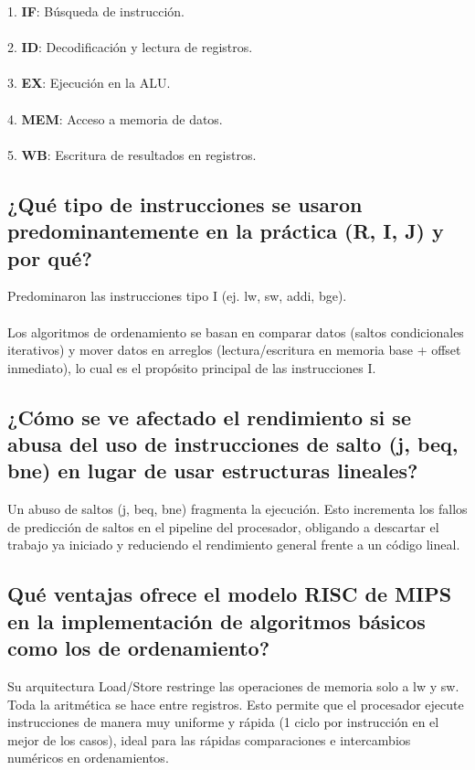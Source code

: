 \documentclass[12pt]{article}
\begin{document}
1. \textbf{IF}: Búsqueda de instrucción.
\\
\\
2. \textbf{ID}: Decodificación y lectura de registros.
\\
\\
3. \textbf{EX}: Ejecución en la ALU.
\\
\\
4. \textbf{MEM}: Acceso a memoria de datos.
\\
\\
5. \textbf{WB}: Escritura de resultados en registros.

\subsection{¿Qué tipo de instrucciones se usaron predominantemente en la práctica (R, I, J) y por 
qué? }
Predominaron las instrucciones tipo I (ej. lw, sw, addi, bge).
\\
\\
Los algoritmos de ordenamiento se basan en comparar datos (saltos condicionales iterativos) y mover datos en arreglos (lectura/escritura en memoria base + offset inmediato), lo cual es el propósito principal de las instrucciones I.

\subsection{¿Cómo se ve afectado el rendimiento si se abusa del uso de instrucciones de salto (j, beq, 
bne) en lugar de usar estructuras lineales?}
Un abuso de saltos (j, beq, bne) fragmenta la ejecución. Esto incrementa los fallos de predicción de saltos en el pipeline del procesador, obligando a descartar el trabajo ya iniciado y reduciendo el rendimiento general frente a un código lineal.

\subsection{Qué ventajas ofrece el modelo RISC de MIPS en la implementación de algoritmos 
básicos como los de ordenamiento?}

Su arquitectura Load/Store restringe las operaciones de memoria solo a lw y sw. Toda la aritmética se hace entre registros. Esto permite que el procesador ejecute instrucciones de manera muy uniforme y rápida (1 ciclo por instrucción en el mejor de los casos), ideal para las rápidas comparaciones e intercambios numéricos en ordenamientos.
\end{document}
